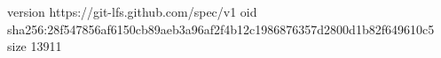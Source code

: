 version https://git-lfs.github.com/spec/v1
oid sha256:28f547856af6150cb89aeb3a96af2f4b12c1986876357d2800d1b82f649610c5
size 13911
